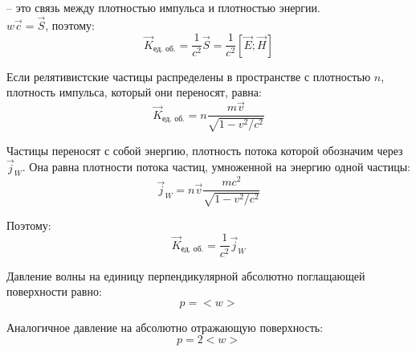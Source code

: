 \documentclass{article}
\begin{document}
	-- это связь между плотностью импульса и плотностью энергии.\\

	$w\vec c=\vec S$, поэтому:
	\begin{equation}
		\vec K_\text{ед. об.} = \frac{1}{c^2}\vec S = \frac{1}{c^2}[\vec E;\vec H]
	\end{equation}

	Если релятивистские частицы распределены в пространстве с плотностью $n$, плотность импульса, который они переносят, равна:
	\begin{equation}
		\vec K_\text{ед. об.} = n\frac{m\vec v}{\sqrt{1-v^2/c^2}}
	\end{equation}

	Частицы переносят с собой энергию, плотность потока которой обозначим через $\vec j_W$. Она равна плотности потока частиц, умноженной на энергию одной частицы:
	\begin{equation}
		\vec j_W = n\vec v\frac{mc^2}{\sqrt{1-v^2/c^2}}
	\end{equation}

	Поэтому:
	\begin{equation}
		\vec K_\text{ед. об.} = \frac{1}{c^2}\vec j_W
	\end{equation}

	Давление волны на единицу перпендикулярной абсолютно поглащающей поверхности равно:
	\begin{equation}
		p = <w>
	\end{equation}

	Аналогичное давление на абсолютно отражающую поверхность:
	\begin{equation}
		p = 2<w>
	\end{equation}
\end{document}
